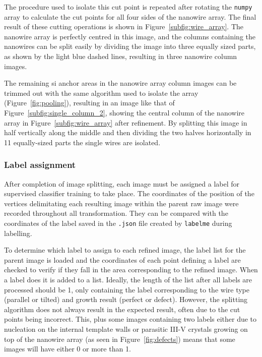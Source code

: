 The procedure used to isolate this cut point is repeated after rotating the \texttt{numpy} array to calculate the cut points for all four sides of the nanowire array. The final result of these cutting operations is shown in Figure~\ref{subfig:wire_array}. The nanowire array is perfectly centred in this image, and the columns containing the nanowires can be split easily by dividing the image into three equally sized parts, as shown by the light blue dashed lines, resulting in three nanowire column images.

The remaining \acl{si} anchor areas in the nanowire array column images can be trimmed out with the same algorithm used to isolate the array (Figure~\ref{fig:pooling}), resulting in an image like that of Figure~\ref{subfig:single_column_2}, showing the central column of the nanowire array in Figure~\ref{subfig:wire_array} after refinement. By splitting this image in half vertically along the middle and then dividing the two halves horizontally in \num{11} equally-sized parts the single wires are isolated.

\subsubsection{Label assignment}

After completion of image splitting, each image must be assigned a label for supervised classifier training to take place. The coordinates of the position of the vertices delimitating each resulting image within the parent raw image were recorded throughout all transformation. They can be compared with the coordinates of the label saved in the \texttt{.json} file created by \texttt{labelme} during labelling.

To determine which label to assign to each refined image, the label list for the parent image is loaded and the coordinates of each point defining a label are checked to verify if they fall in the area corresponding to the refined image. When a label does it is added to a list. Ideally, the length of the list after all labels are processed should be \num{1}, only containing the label corresponding to the wire type (parallel or tilted) and growth result (perfect or defect). However, the splitting algorithm does not always result in the expected result, often due to the cut points being incorrect. This, plus some images containing two labels either due to nucleation on the internal template walls or parasitic III-V crystals growing on top of the nanowire array (as seen in Figure~\ref{fig:defects}) means that some images will have either \num{0} or more than \num{1}. 

